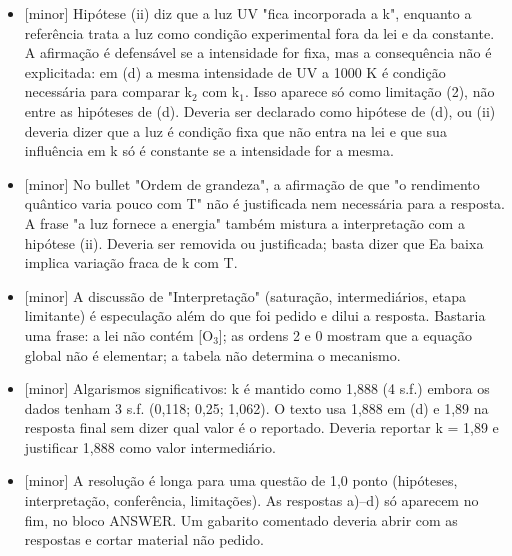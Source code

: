 \documentclass{article}%
\begin{document}
\begin{itemize}%
\item%
{[}minor{]} Hipótese (ii) diz que a luz UV "fica incorporada a k", enquanto a referência trata a luz como condição experimental fora da lei e da constante. A afirmação é defensável se a intensidade for fixa, mas a consequência não é explicitada: em (d) a mesma intensidade de UV a 1000 K é condição necessária para comparar k$_{2}$ com k$_{1}$. Isso aparece só como limitação (2), não entre as hipóteses de (d). Deveria ser declarado como hipótese de (d), ou (ii) deveria dizer que a luz é condição fixa que não entra na lei e que sua influência em k só é constante se a intensidade for a mesma.%
\item%
{[}minor{]} No bullet "Ordem de grandeza", a afirmação de que "o rendimento quântico varia pouco com T" não é justificada nem necessária para a resposta. A frase "a luz fornece a energia" também mistura a interpretação com a hipótese (ii). Deveria ser removida ou justificada; basta dizer que Ea baixa implica variação fraca de k com T.%
\item%
{[}minor{]} A discussão de "Interpretação" (saturação, intermediários, etapa limitante) é especulação além do que foi pedido e dilui a resposta. Bastaria uma frase: a lei não contém {[}O$_{3}${]}; as ordens 2 e 0 mostram que a equação global não é elementar; a tabela não determina o mecanismo.%
\item%
{[}minor{]} Algarismos significativos: k é mantido como 1,888 (4 s.f.) embora os dados tenham 3 s.f. (0,118; 0,25; 1,062). O texto usa 1,888 em (d) e 1,89 na resposta final sem dizer qual valor é o reportado. Deveria reportar k = 1,89 e justificar 1,888 como valor intermediário.%
\item%
{[}minor{]} A resolução é longa para uma questão de 1,0 ponto (hipóteses, interpretação, conferência, limitações). As respostas a)--d) só aparecem no fim, no bloco ANSWER. Um gabarito comentado deveria abrir com as respostas e cortar material não pedido.%
\end{itemize}%
\end{document}
